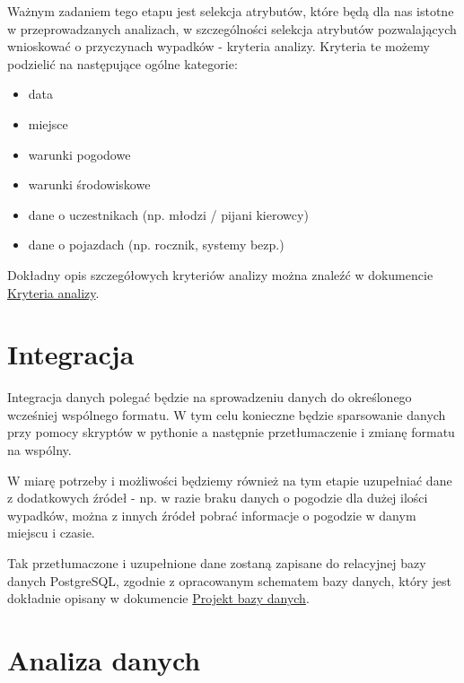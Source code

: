 Ważnym zadaniem tego etapu jest selekcja atrybutów, które będą dla nas
istotne w przeprowadzanych analizach, w szczególności selekcja atrybutów
pozwalających wnioskować o przyczynach wypadków - kryteria analizy.
Kryteria te możemy podzielić na następujące ogólne kategorie:

\begin{itemize}
\itemsep-14pt\parskip0pt
\item
  data\\
\item
  miejsce\\
\item
  warunki pogodowe\\
\item
  warunki środowiskowe\\
\item
  dane o uczestnikach (np. młodzi / pijani kierowcy)\\
\item
  dane o pojazdach (np. rocznik, systemy bezp.)
\end{itemize}

Dokładny opis szczegółowych kryteriów analizy można znaleźć w dokumencie
\href{Kryteria-analizy}{Kryteria analizy}.

\section{Integracja}\label{integracja}

Integracja danych polegać będzie na sprowadzeniu danych do określonego
wcześniej wspólnego formatu. W tym celu konieczne będzie sparsowanie
danych przy pomocy skryptów w pythonie a następnie przetłumaczenie i
zmianę formatu na wspólny.

W miarę potrzeby i możliwości będziemy również na tym etapie uzupełniać
dane z dodatkowych źródeł - np. w razie braku danych o pogodzie dla
dużej ilości wypadków, można z innych źródeł pobrać informacje o
pogodzie w danym miejscu i czasie.

Tak przetłumaczone i uzupełnione dane zostaną zapisane do relacyjnej
bazy danych PostgreSQL, zgodnie z opracowanym schematem bazy danych,
który jest dokładnie opisany w dokumencie
\href{Projekt-bazy-danych}{Projekt bazy danych}.

\section{Analiza danych}\label{analiza-danych}

